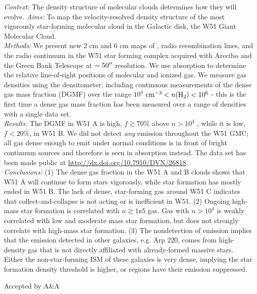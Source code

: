 \documentclass[]{article}
\begin{document}
{

\textit{Context:} The density structure of molecular clouds determines how they will evolve.
\textit{Aims:} To map the velocity-resolved density structure of the most vigorously
star-forming molecular cloud in the Galactic disk, the W51 Giant Molecular
Cloud.\\
\textit{Methods:}
We present new 2 cm and 6 cm maps of \formaldehyde, radio recombination lines,
and the radio continuum in the W51 star forming complex acquired with Arecibo
and the Green Bank Telescope at $\sim50\mbox{$^{\prime\prime}$}$ resolution.
We use \formaldehyde absorption to determine the relative line-of-sight
positions of molecular and ionized gas.  We measure gas densities using the
\formaldehyde densitometer, including continuous measurements of the dense gas
mass
fraction (DGMF) over the range $10^4$ $\textrm{cm}^{-3}< n(\textrm{H}_{2}) < 10^6$ \percc - this is
the first time a dense gas mass fraction has been measured over a range
of densities with a single data set.\\
\textit{Results:} The DGMF in W51 A is high, $f\gtrsim70\%$ above $n>10^4$
\percc, while it is low, $f<20\%$, in W51 B.
We did not detect \emph{any} \formaldehyde emission throughout the W51 GMC; all
gas dense enough to emit under normal conditions is in front of bright
continuum sources and therefore is seen in absorption instead.  
The data set has been made public at \protect\url{http://dx.doi.org/10.7910/DVN/26818}. \\
\textit{Conclusions:} (1) The dense gas fraction in the W51 A and B clouds shows that W51 A will
continue to form stars vigorously, while star formation has mostly ended in W51
B.  The lack of dense, star-forming gas around W51 C indicates that
collect-and-collapse is not acting or is inefficient in W51.
(2) Ongoing high-mass star formation is correlated with $n\gtrsim1\ee{5}$
\percc gas.  Gas with $n>10^4$ \percc is weakly correlated with low and
moderate mass star formation, but does not strongly correlate with high-mass
star formation.
(3) The nondetection of \formaldehyde emission implies that the  emission
detected in other galaxies, e.g. Arp 220, comes from high-density gas that is
not directly affiliated with already-formed massive stars.  Either the
non-star-forming ISM of these galaxies is very dense, implying
the star formation density threshold is higher, or \hii regions have
their emission suppressed.

}



{ Accepted by A\&A }

\end{document}
